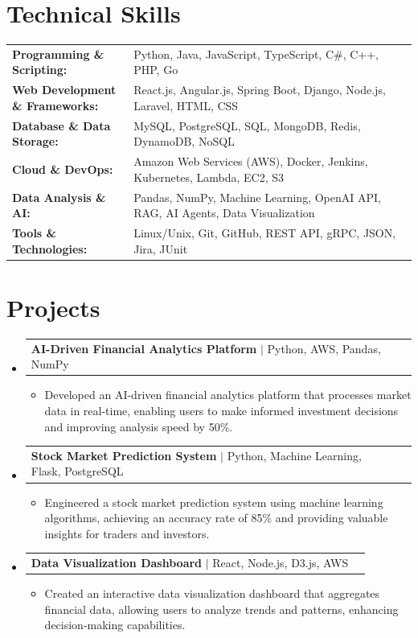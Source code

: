 \documentclass[letterpaper,10pt]{article}
\makeatletter
\newcommand{\resumeItem}[1]{
  \item{\fontsize{8pt}{9pt}\selectfont
    #1 \vspace{-3pt}
  }
}
\newcommand{\resumeProjectHeading}[2]{
    \item
    \begin{tabular*}{1.001\textwidth}{l@{\extracolsep{\fill}}r}
      \fontsize{8.5pt}{10pt}#1 & \textbf{\fontsize{8.5pt}{10pt} #2}\\
    \end{tabular*}\vspace{-7pt}
}
\newcommand{\resumeSubHeadingListStart}{\begin{itemize}[leftmargin=0pt, label={}]}
\newcommand{\resumeSubHeadingListEnd}{\end{itemize}}
\newcommand{\resumeItemListStart}{\begin{itemize}[leftmargin=*]}
\newcommand{\resumeItemListEnd}{\end{itemize}\vspace{-5pt}}
\makeatother
\begin{document}
\section{Technical Skills}
        \vspace{-14pt}
        \begin{table}[h]
            \fontsize{8pt}{9pt}\selectfont
            \begin{tabular}{p{0.3\linewidth} p{0.7\linewidth}}
                \textbf{Programming \& Scripting:} & Python, Java, JavaScript, TypeScript, C\#, C++, PHP, Go \\
                \textbf{Web Development \& Frameworks:} & React.js, Angular.js, Spring Boot, Django, Node.js, Laravel, HTML, CSS \\
                \textbf{Database \& Data Storage:} & MySQL, PostgreSQL, SQL, MongoDB, Redis, DynamoDB, NoSQL \\
                \textbf{Cloud \& DevOps:} & Amazon Web Services (AWS), Docker, Jenkins, Kubernetes, Lambda, EC2, S3 \\
                \textbf{Data Analysis \& AI:} & Pandas, NumPy, Machine Learning, OpenAI API, RAG, AI Agents, Data Visualization \\
                \textbf{Tools \& Technologies:} & Linux/Unix, Git, GitHub, REST API, gRPC, JSON, Jira, JUnit \\
            \end{tabular}
        \end{table}
 \vspace{-18pt}

\section{Projects}
    \vspace{-5pt}
    \resumeSubHeadingListStart
          \resumeProjectHeading
            {\textbf{AI-Driven Financial Analytics Platform} $|$ Python, AWS, Pandas, NumPy}{}
            \resumeItemListStart
                \resumeItem{Developed an AI-driven financial analytics platform that processes market data in real-time, enabling users to make informed investment decisions and improving analysis speed by 50\%.}
            \resumeItemListEnd
        \vspace{-12pt}
    
        \resumeProjectHeading
            {\textbf{Stock Market Prediction System} $|$ Python, Machine Learning, Flask, PostgreSQL}{}
        \resumeItemListStart
                \resumeItem{Engineered a stock market prediction system using machine learning algorithms, achieving an accuracy rate of 85\% and providing valuable insights for traders and investors.}
        \resumeItemListEnd
      \vspace{-12pt}
      \resumeProjectHeading
        {\textbf{Data Visualization Dashboard} $|$ React, Node.js, D3.js, AWS}{}
    \resumeItemListStart
            \resumeItem{Created an interactive data visualization dashboard that aggregates financial data, allowing users to analyze trends and patterns, enhancing decision-making capabilities.}
    \resumeItemListEnd
    \resumeSubHeadingListEnd
\end{document}
